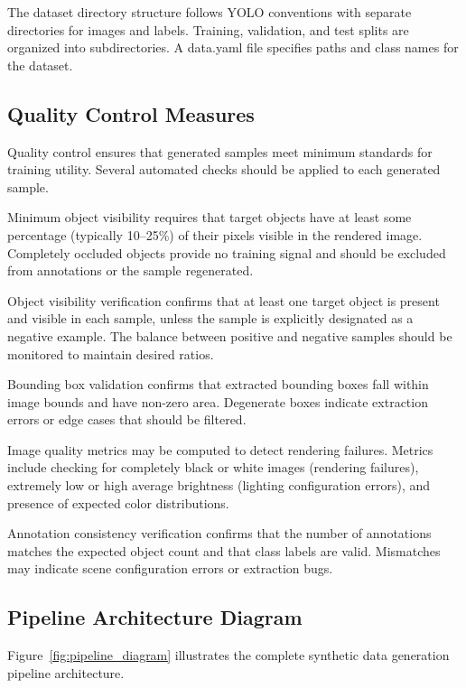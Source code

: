 The dataset directory structure follows YOLO conventions with separate directories for images and labels. Training, validation, and test splits are organized into subdirectories. A data.yaml file specifies paths and class names for the dataset.

\subsection{Quality Control Measures}

Quality control ensures that generated samples meet minimum standards for training utility. Several automated checks should be applied to each generated sample.

Minimum object visibility requires that target objects have at least some percentage (typically 10--25\%) of their pixels visible in the rendered image. Completely occluded objects provide no training signal and should be excluded from annotations or the sample regenerated.

Object visibility verification confirms that at least one target object is present and visible in each sample, unless the sample is explicitly designated as a negative example. The balance between positive and negative samples should be monitored to maintain desired ratios.

Bounding box validation confirms that extracted bounding boxes fall within image bounds and have non-zero area. Degenerate boxes indicate extraction errors or edge cases that should be filtered.

Image quality metrics may be computed to detect rendering failures. Metrics include checking for completely black or white images (rendering failures), extremely low or high average brightness (lighting configuration errors), and presence of expected color distributions.

Annotation consistency verification confirms that the number of annotations matches the expected object count and that class labels are valid. Mismatches may indicate scene configuration errors or extraction bugs.

\subsection{Pipeline Architecture Diagram}

Figure~\ref{fig:pipeline_diagram} illustrates the complete synthetic data generation pipeline architecture.

